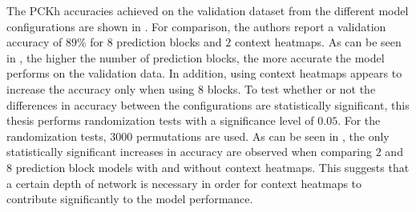 The PCKh accuracies achieved on the validation dataset from the different model configurations are shown in .
For comparison, the authors report a validation accuracy of $89\%$ for $8$ prediction blocks and $2$ context heatmaps.
As can be seen in , the higher the number of prediction blocks, the more accurate the model performs on the validation data.
In addition, using context heatmaps appears to increase the accuracy only when using $8$ blocks.
To test whether or not the differences in accuracy between the configurations are statistically significant, this thesis performs randomization tests with a significance level of $0.05$.
For the randomization tests, $3000$ permutations are used.
As can be seen in , the only statistically significant increases in accuracy are observed when comparing $2$ and $8$ prediction block models with and without context heatmaps.
This suggests that a certain depth of network is necessary in order for context heatmaps to contribute significantly to the model performance.

\begin{table}[]
    \centering
    \caption{PCKh test results of our recreation in direct comparison to the original work by \cite{luvizon_2d/3d_2018} using $\alpha = 0.5$. The change in total accuracy is statistically significant with a significance level of $0.05$. }
    \label{tab:mpii_test}
\end{table}

